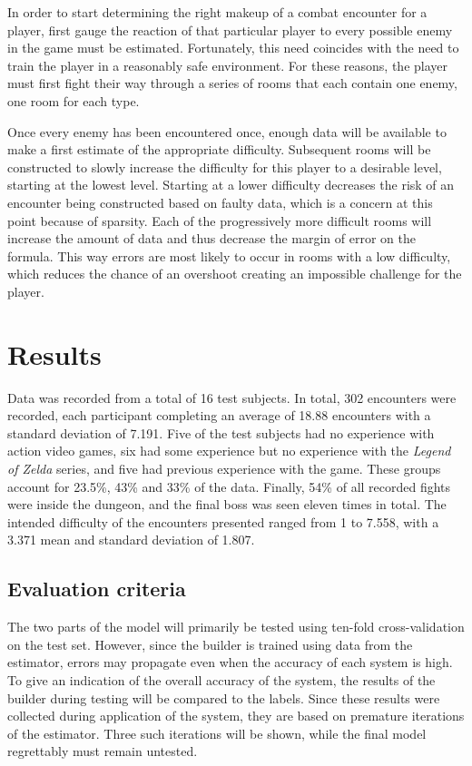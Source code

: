 \documentclass[a4paper]{article}
\begin{document}
\begin{multicols*}{2}
In order to start determining the right makeup of a combat encounter for a player, first gauge the reaction of that particular player to every possible enemy in the game must be estimated. Fortunately, this need coincides with the need to train the player in a reasonably safe environment. For these reasons, the player must first fight their way through a series of rooms that each contain one enemy, one room for each type. 

Once every enemy has been encountered once, enough data will be available to make a first estimate of the appropriate difficulty. Subsequent rooms will be constructed to slowly increase the difficulty for this player to a desirable level, starting at the lowest level. Starting at a lower difficulty decreases the risk of an encounter being constructed based on faulty data, which is a concern at this point because of sparsity. Each of the progressively more difficult rooms will increase the amount of data and thus decrease the margin of error on the formula. This way errors are most likely to occur in rooms with a low difficulty, which reduces the chance of an overshoot creating an impossible challenge for the player.

\section{Results} \label{results}
Data was recorded from a total of 16 test subjects. In total, 302 encounters were recorded, each participant completing an average of 18.88 encounters with a standard deviation of 7.191. Five of the test subjects had no experience with action video games, six had some experience but no experience with the \emph{Legend of Zelda} series, and five had previous experience with the game. These groups account for 23.5\%, 43\% and 33\% of the data. Finally, 54\% of all recorded fights were inside the dungeon, and the final boss was seen eleven times in total. The intended difficulty of the encounters presented ranged from 1 to 7.558, with a 3.371 mean and standard deviation of 1.807.

\subsection{Evaluation criteria}
The two parts of the model will primarily be tested using ten-fold cross-validation on the test set. However, since the builder is trained using data from the estimator, errors may propagate even when the accuracy of each system is high. To give an indication of the overall accuracy of the system, the results of the builder during testing will be compared to the labels. Since these results were collected during application of the system, they are based on premature iterations of the estimator. Three such iterations will be shown, while the final model regrettably must remain untested.


\end{multicols*}
\end{document}
